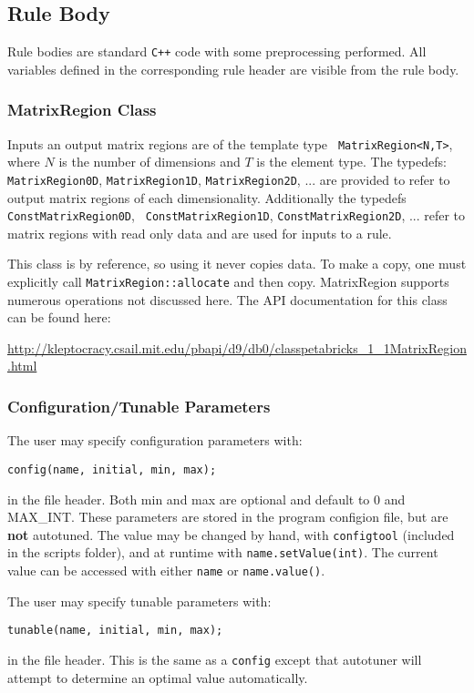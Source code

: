 \documentclass[11pt]{article}
\begin{document}
\subsection{Rule Body}
\label{sec:body}

Rule bodies are standard {\tt C++} code with some preprocessing performed.
All variables defined in the corresponding rule header are visible from the 
rule body.

\subsubsection{MatrixRegion Class}
Inputs an output matrix regions are of the template type {\tt
MatrixRegion<N,T>}, where $N$ is the number of dimensions and $T$ is the
element type.  The typedefs: {\tt MatrixRegion0D}, {\tt MatrixRegion1D},
{\tt MatrixRegion2D}, ... are provided to refer to output matrix regions of each
dimensionality.  Additionally the typedefs {\tt ConstMatrixRegion0D}, {\tt
ConstMatrixRegion1D}, {\tt ConstMatrixRegion2D}, ... refer to matrix
regions with read only data and are used for inputs to a rule.

This class is by reference, so using it never copies data. To make a copy,
one must explicitly call {\tt MatrixRegion::allocate} and then copy.
MatrixRegion supports numerous operations not discussed here.  The API
documentation for this class can be found here:

\noindent
\url{http://kleptocracy.csail.mit.edu/pbapi/d9/db0/classpetabricks_1_1MatrixRegion.html}

\subsubsection{Configuration/Tunable Parameters}

The user may specify configuration parameters with:
\begin{verbatim}
config(name, initial, min, max);
\end{verbatim}
in the file header.  Both min and max are optional and default to 0 and
MAX\_INT.  These parameters are stored in the program configion file, but are
{\bf not} autotuned.  The value may be changed by hand, with {\tt configtool}
(included in the scripts folder), and at runtime with {\tt name.setValue(int)}.
The current value can be accessed with either {\tt name} or {\tt name.value()}.

The user may specify tunable parameters with:
\begin{verbatim}
tunable(name, initial, min, max);
\end{verbatim}
in the file header.  This is the same as a {\tt config} except that autotuner 
will attempt to determine an optimal value automatically.
\end{document}
